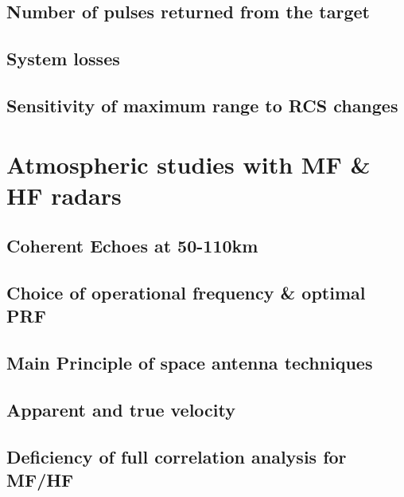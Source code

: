 \subsection{Number of pulses returned from the target}

\subsection{System losses}

\subsection{Sensitivity of maximum range to RCS changes}

\section{Atmospheric studies with MF \& HF radars}

\subsection{Coherent Echoes at 50-110km}

\subsection{Choice of operational frequency \& optimal PRF}

\subsection{Main Principle of space antenna techniques}

\subsection{Apparent and true velocity}

\subsection{Deficiency of full correlation analysis for MF/HF}


